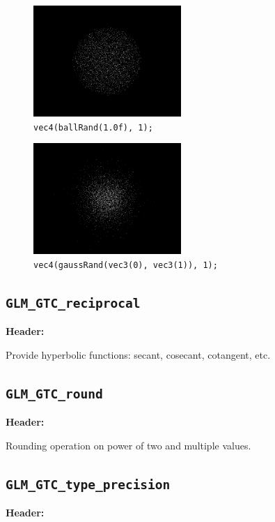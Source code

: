 \documentclass{scrartcl}
\numberwithin{figure}{subsection}
\begin{document}
\begin{figure}[h]
  \centering
  \includegraphics[width=0.5\textwidth]{ballrand}
  \cprotect\caption{\verb|vec4(ballRand(1.0f), 1);|}
\end{figure}

\begin{figure}[h]
  \centering
  \includegraphics[width=0.5\textwidth]{gaussrand}
  \cprotect\caption{\verb|vec4(gaussRand(vec3(0), vec3(1)), 1);|}
\end{figure}

\subsection{\texttt{GLM\_GTC\_reciprocal}}
\textbf{Header:} 

Provide hyperbolic functions: secant, cosecant, cotangent, etc.

\subsection{\texttt{GLM\_GTC\_round}}
\textbf{Header:} 

Rounding operation on power of two and multiple values.


\subsection{\texttt{GLM\_GTC\_type\_precision}}
\textbf{Header:} 
\end{document}
